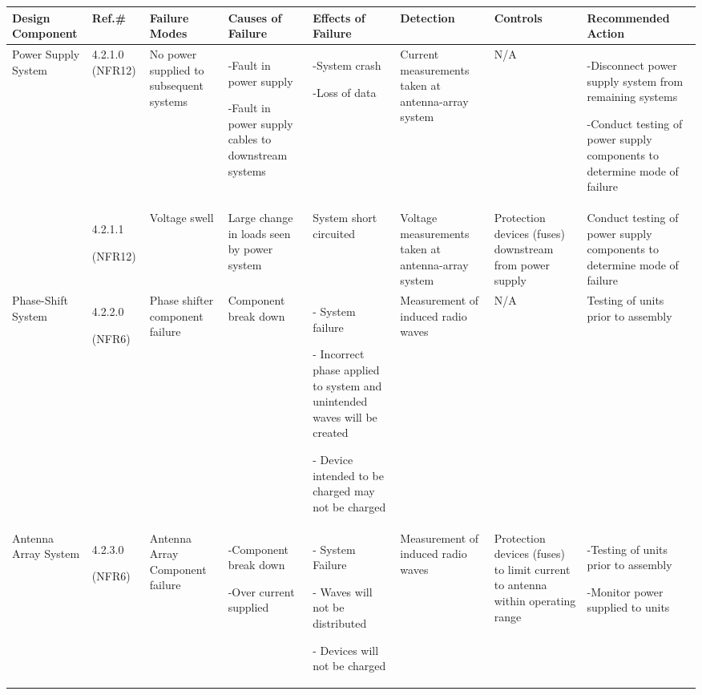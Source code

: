 \documentclass[12pt, titlepage]{article}
\begin{document}
\begin{center}
\begin{adjustwidth}{-3.5cm}{}
\begin{tabular}{|p{1.6cm}|p{1.2cm}|p{1.6cm}|p{2.4cm}|p{2cm}|p{2.2cm}|p{2cm}|p{4.5cm}|}
\hline
Design Component & Ref.\# & Failure Modes & Causes of Failure & Effects of Failure & Detection & Controls & Recommended Action\\
\hline
Power Supply System & 4.2.1.0 (NFR12)& No power supplied to subsequent systems & -Fault in power supply \par -Fault in power supply cables to downstream systems & -System crash \par -Loss of data & Current measurements taken at antenna-array system & N/A & -Disconnect power supply system from remaining systems \par -Conduct testing of power supply components to determine mode of failure \par\\

& 4.2.1.1\par (NFR12) & Voltage swell & Large change in loads seen by power system & System short circuited & Voltage measurements taken at antenna-array system & Protection devices (fuses) downstream from power supply & Conduct testing of power supply components to determine mode of failure\\
\hline
Phase-Shift System & 4.2.2.0 \par (NFR6) & Phase shifter component failure & Component break down & - System failure \par - Incorrect phase applied to system and unintended waves will be created \par - Device intended to be charged may not be charged & Measurement of induced radio waves & N/A & Testing of units prior to assembly\\
\hline
Antenna Array System & 4.2.3.0 \par (NFR6) & Antenna Array Component failure & -Component break down \par -Over current supplied & - System Failure \par - Waves will not be distributed \par - Devices will not be charged & Measurement of induced radio waves & Protection devices (fuses) to limit current to antenna within operating range & -Testing of units prior to assembly \par -Monitor power supplied to units\\
\hline
\end{tabular}
\end{adjustwidth}
\end{center}
\end{document}
